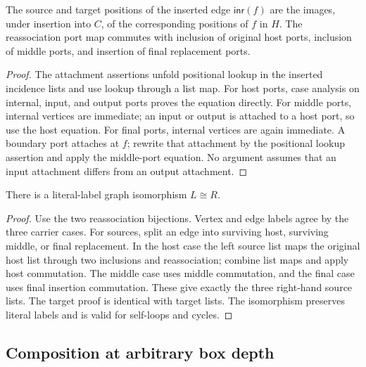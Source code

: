 \begin{lemma}
The source and target positions of the inserted edge $\mathsf{inr}(f)$ are the
images, under insertion into $C$, of the corresponding positions of $f$ in $H$.
The reassociation port map commutes with inclusion of original host ports,
inclusion of middle ports, and insertion of final replacement ports.
\end{lemma}
\begin{proof}
The attachment assertions unfold positional lookup in the inserted incidence
lists and use lookup through a list map. For host ports, case analysis on
internal, input, and output ports proves the equation directly. For middle
ports, internal vertices are immediate; an input or output is attached to a
host port, so use the host equation. For final ports, internal vertices are
again immediate. A boundary port attaches at $f$; rewrite that attachment by
the positional lookup assertion and apply the middle-port equation.
No argument assumes that an input attachment differs from an output attachment.
\end{proof}

\begin{theorem}
There is a literal-label graph isomorphism $L\cong R$.
\end{theorem}
\begin{proof}
Use the two reassociation bijections. Vertex and edge labels agree by the
three carrier cases. For sources, split an edge into surviving host, surviving
middle, or final replacement. In the host case the left source list maps the
original host list through two inclusions and reassociation; combine list maps
and apply host commutation. The middle case uses middle commutation, and the
final case uses final insertion commutation. These give exactly the three
right-hand source lists. The target proof is identical with target lists.
The isomorphism preserves literal labels and is valid for self-loops and cycles.
\end{proof}

\subsection{Composition at arbitrary box depth}

